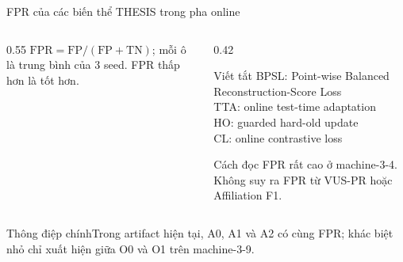 \documentclass[aspectratio=169]{beamer}
\newcommand{\takeaway}[1]{\begin{alertblock}{Thông điệp chính}#1\end{alertblock}}
\begin{document}
\begin{frame}{FPR của các biến thể THESIS trong pha online}
  \begin{columns}[T,onlytextwidth]
    \begin{column}{0.55\textwidth}
      \scriptsize
      \vspace{0.2em}
      \scriptsize $\mathrm{FPR}=\mathrm{FP}/(\mathrm{FP}+\mathrm{TN})$; mỗi ô là trung bình của 3 seed. FPR thấp hơn là tốt hơn.
    \end{column}
    \begin{column}{0.42\textwidth}
      \scriptsize
      \begin{block}{Viết tắt}
        BPSL: Point-wise Balanced Reconstruction-Score Loss\\
        TTA: online test-time adaptation\\
        HO: guarded hard-old update\\
        CL: online contrastive loss
      \end{block}
      \begin{alertblock}{Cách đọc}
        FPR rất cao ở machine-3-4. Không suy ra FPR từ VUS-PR hoặc Affiliation F1.
      \end{alertblock}
    \end{column}
  \end{columns}
  \takeaway{Trong artifact hiện tại, A0, A1 và A2 có cùng FPR; khác biệt nhỏ chỉ xuất hiện giữa O0 và O1 trên machine-3-9.}
\end{frame}
\end{document}
